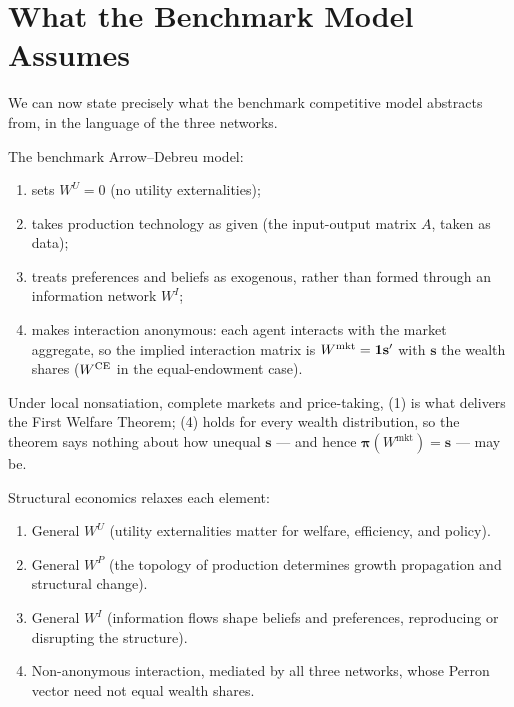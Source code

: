 \documentclass[../structural_economics_book.tex]{subfiles}
\begin{document}
\section{What the Benchmark Model Assumes}
\label{ch05:sec:standard_revisited}

We can now state precisely what the benchmark competitive model abstracts from, in the language of the three networks.

\begin{remark}\label{ch05:prop:standard}
The benchmark Arrow--Debreu model:
\begin{enumerate}
\item sets $W^U = 0$ (no utility externalities);
\item takes production technology as given (the input-output matrix $A$, taken as data);
\item treats preferences and beliefs as exogenous, rather than formed through an information network $W^I$;
\item makes interaction anonymous: each agent interacts with the market aggregate, so the implied interaction matrix is $W^{\text{mkt}} = \mathbf{1}\mathbf{s}'$ with $\mathbf{s}$ the wealth shares ($W^{\text{CE}}$ in the equal-endowment case).
\end{enumerate}
Under local nonsatiation, complete markets and price-taking, (1) is what delivers the First Welfare Theorem; (4) holds for every wealth distribution, so the theorem says nothing about how unequal $\mathbf{s}$ --- and hence $\boldsymbol{\pi}(W^{\text{mkt}}) = \mathbf{s}$ --- may be.

Structural economics relaxes each element:
\begin{enumerate}
\item General $W^U$ (utility externalities matter for welfare, efficiency, and policy).
\item General $W^P$ (the topology of production determines growth propagation and structural change).
\item General $W^I$ (information flows shape beliefs and preferences, reproducing or disrupting the structure).
\item Non-anonymous interaction, mediated by all three networks, whose Perron vector need not equal wealth shares.
\end{enumerate}
\end{remark}
\end{document}
